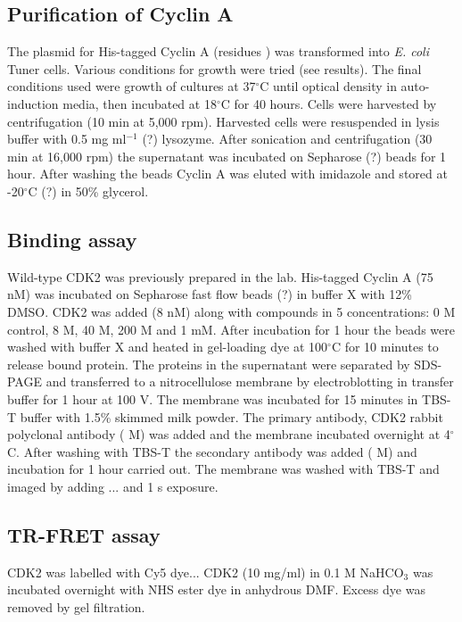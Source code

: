 \subsection{Purification of Cyclin A}

The plasmid for His-tagged Cyclin A (residues ) was transformed into \textit{E. coli} Tuner cells.
Various conditions for growth were tried (see results).
The final conditions used were growth of cultures at 37$^{\circ}$C until optical density in auto-induction media, then incubated at 18$^{\circ}$C for 40 hours.
Cells were harvested by centrifugation (10 min at 5,000 rpm).
Harvested cells were resuspended in lysis buffer with 0.5 mg ml$^{-1}$ (?) lysozyme.
After sonication and centrifugation (30 min at 16,000 rpm) the supernatant was incubated on Sepharose (?) beads for 1 hour.
After washing the beads Cyclin A was eluted with imidazole and stored at -20$^{\circ}$C (?) in 50\% glycerol.


\subsection{Binding assay}

Wild-type CDK2 was previously prepared in the lab.
His-tagged Cyclin A (75 nM) was incubated on Sepharose fast flow beads (?) in buffer X with 12\% DMSO.
CDK2 was added (8 nM) along with compounds in 5 concentrations: 0 M control, 8 \textmu M, 40 \textmu M, 200 \textmu M and 1 mM.
After incubation for 1 hour the beads were washed with buffer X and heated in gel-loading dye at 100$^{\circ}$C for 10 minutes to release bound protein.
The proteins in the supernatant were separated by SDS-PAGE and transferred to a nitrocellulose membrane by electroblotting in transfer buffer for 1 hour at 100 V.
The membrane was incubated for 15 minutes in TBS-T buffer with 1.5\% skimmed milk powder.
The primary antibody, CDK2 rabbit polyclonal antibody ( M) was added and the membrane incubated overnight at 4$^{\circ}$C.
After washing with TBS-T the secondary antibody was added ( M) and incubation for 1 hour carried out.
The membrane was washed with TBS-T and imaged by adding ... and 1 s exposure.


\subsection{TR-FRET assay}

CDK2 was labelled with Cy5 dye...
CDK2 (10 mg/ml) in 0.1 M NaHCO$_{3}$ was incubated overnight with NHS ester dye in anhydrous DMF.
Excess dye was removed by gel filtration.

